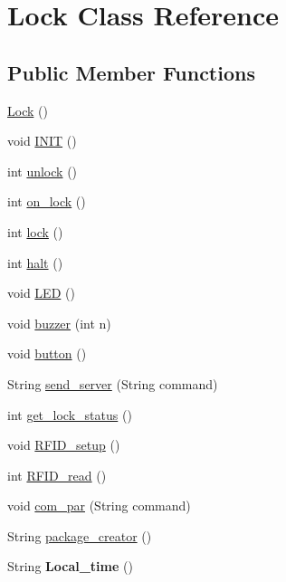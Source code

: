\hypertarget{classLock}{}\section{Lock Class Reference}
\label{classLock}
\subsection*{Public Member Functions}
\begin{DoxyCompactItemize}
\item 
\hyperlink{classLock_a9944623567d8138b95e74fadc7190adb}{Lock} ()
\item 
void \hyperlink{classLock_a4c2e4681b8c0554513336d4d8a2b5ae0}{I\+N\+IT} ()
\item 
int \hyperlink{classLock_a3ddbac8fd0d1c72745ed66e541c602c7}{unlock} ()
\item 
int \hyperlink{classLock_a1f17ec767fefe3e6119d58791613d535}{on\+\_\+lock} ()
\item 
int \hyperlink{classLock_adc2fc021ff79cd4c47292257d5ae4994}{lock} ()
\item 
int \hyperlink{classLock_ac8d63185b00be8be043eb514329419d1}{halt} ()
\item 
void \hyperlink{classLock_aabf72af9ea6e8e0f66170c1cd1a20a71}{L\+ED} ()
\item 
void \hyperlink{classLock_ac4b44d2889106f98e0ffacbc708867ad}{buzzer} (int n)
\item 
void \hyperlink{classLock_a05170f58d6268b5d35a238d67ff4f64a}{button} ()
\item 
String \hyperlink{classLock_a9eec8ba8bcc9cb29180d84bdfe269737}{send\+\_\+server} (String command)
\item 
int \hyperlink{classLock_a55dc78acdb892082057800da5799b8d5}{get\+\_\+lock\+\_\+status} ()
\item 
void \hyperlink{classLock_a3098316dfd4c5219ae53bcae5d39e9f7}{R\+F\+I\+D\+\_\+setup} ()
\item 
int \hyperlink{classLock_a8be0477d803f4c8c0d12b2b37762b6b2}{R\+F\+I\+D\+\_\+read} ()
\item 
void \hyperlink{classLock_a2bbd04c8b84138caefb66bebcdcb0e39}{com\+\_\+par} (String command)
\item 
String \hyperlink{classLock_ab0a6a877d1b66823e7d85eccc30a7f3e}{package\+\_\+creator} ()
\item 
String {\bfseries Local\+\_\+time} ()\hypertarget{classLock_ab84d76a1a79bfe3dd9219e9a257758c7}{}\label{classLock_ab84d76a1a79bfe3dd9219e9a257758c7}


\end{DoxyCompactItemize}
